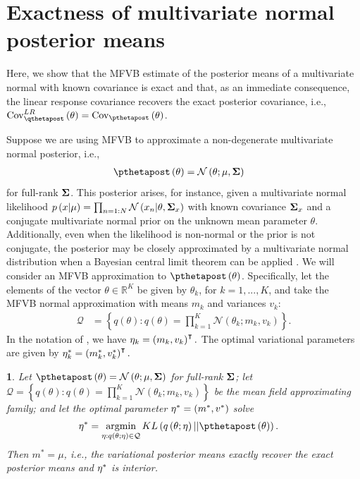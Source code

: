 \documentclass{article}\usepackage[]{graphicx}\usepackage[]{color}
\theoremstyle{plain}
\theoremstyle{definition}
\theoremstyle{plain}
\theoremstyle{plain}
\theoremstyle{plain}
\theoremstyle{plain}
\newtheorem{lem}[thm]{\protect\lemmaname}
\providecommand{\lemmaname}{Lemma}
\begin{document}
\section{Exactness of multivariate normal posterior means\label{app:mvn_exact}}

Here, we show that the MFVB estimate of the posterior means of a multivariate
normal with known covariance is exact and that, as an immediate consequence,
the linear response covariance recovers the exact posterior covariance,
i.e., $\lrvbcov\left(\theta\right)=\cov_{\pthetapost}\left(\theta\right)$.

Suppose we are using MFVB to approximate a non-degenerate multivariate
normal posterior, i.e.,
\begin{align*}
\pthetapost\left(\theta\right) & =\mathcal{N}\left(\theta;\mu,\covmat\right)
\end{align*}
for full-rank $\boldsymbol{\Sigma}$. This posterior arises, for instance, given
a multivariate normal likelihood $p\left(x\vert\mu\right)=\prod_{n=1:N}\mathcal{N}\left(x_{n}\vert\theta,\boldsymbol{\Sigma}_{x}\right)$
with known covariance $\boldsymbol{\Sigma}_{x}$ and a conjugate multivariate
normal prior on the unknown mean parameter $\theta$. Additionally,
even when the likelihood is non-normal or the prior is not conjugate,
the posterior may be closely approximated by a multivariate normal
distribution when a Bayesian central limit theorem can be applied
\citep[Chapter 8]{lecam:2012:asymptotics}. We will consider an MFVB
approximation to $\pthetapost\left(\theta\right)$. Specifically,
let the elements of the vector $\theta\in\mathbb{R}^{K}$ be given
by $\theta_{k}$, for $k=1,...,K$, and take the MFVB normal approximation
with means $m_{k}$ and variances $v_{k}$:
\begin{align*}
\mathcal{Q} & =\left\{ q\left(\theta\right):q\left(\theta\right)=\prod_{k=1}^{K}\mathcal{N}\left(\theta_{k};m_{k},v_{k}\right)\right\} .
\end{align*}
In the notation of , we have $\eta_{k}=\left(m_{k},v_{k}\right)^{\intercal}.$
The optimal variational parameters are given by $\eta_{k}^{*}=\left(m_{k}^{*},v_{k}^{*}\right)^{\intercal}.$
\begin{lem}
\label{lem:mvn_exact}Let $\pthetapost\left(\theta\right)=\mathcal{N}\left(\theta;\mu,\covmat\right)$
for full-rank $\boldsymbol{\Sigma}$; let $\mathcal{Q}=\left\{ q\left(\theta\right):q\left(\theta\right)=\prod_{k=1}^{K}\mathcal{N}\left(\theta_{k};m_{k},v_{k}\right)\right\} $
be the mean field approximating family; and let the optimal parameter
$\eta^{*}=\left(m^{*},v^{*}\right)$ solve 
\begin{align*}
\etaopt & =\argmin_{\eta:q\left(\theta;\eta\right)\in\mathcal{Q}}KL\left(q\left(\theta;\eta\right)||\pthetapost\left(\theta\right)\right).
\end{align*}
Then $m^{*}=\mu$, i.e., the variational posterior means exactly recover
the exact posterior means and $\eta^{*}$ is interior.
\end{lem}
\end{document}
